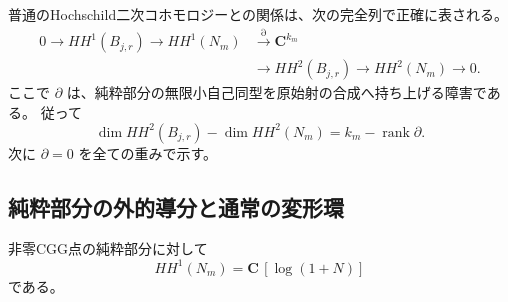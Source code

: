 普通のHochschild二次コホモロジーとの関係は、次の完全列で正確に表される。
\begin{equation}
 \begin{split}
 0\longrightarrow HH^1(B_{j,r})\longrightarrow HH^1(N_m)
 &\xrightarrow{\partial}\mathbf C^{k_m}\\
 &\longrightarrow HH^2(B_{j,r})\longrightarrow HH^2(N_m)\longrightarrow0.
 \end{split}
 \label{eq:all-weight-relative-long-exact-v40}
\end{equation}
ここで $\partial$ は、純粋部分の無限小自己同型を原始射の合成へ持ち上げる障害である。
従って
\[
 \dim HH^2(B_{j,r})-\dim HH^2(N_m)=k_m-\operatorname{rank}\partial.
\]
次に $\partial=0$ を全ての重みで示す。

\subsection{純粋部分の外的導分と通常の変形環}

\begin{lemma}[純粋部分の外的導分は全重みで一次元]
\label{lem:all-weight-pure-HH1-v40}
非零CGG点の純粋部分に対して
\[
 HH^1(N_m)=\mathbf C\,[\log(1+N)]
\]
である。
\end{lemma}


